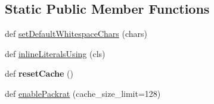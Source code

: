 \subsection*{Static Public Member Functions}
\begin{DoxyCompactItemize}
\item 
def \hyperlink{classpkg__resources_1_1__vendor_1_1pyparsing_1_1_parser_element_af1dc7ba7745bc9323f0559b197abe429}{set\+Default\+Whitespace\+Chars} (chars)
\item 
def \hyperlink{classpkg__resources_1_1__vendor_1_1pyparsing_1_1_parser_element_a0cc7c1046ec15301a82d135bad3190ba}{inline\+Literals\+Using} (cls)
\item 
\mbox{\label{classpkg__resources_1_1__vendor_1_1pyparsing_1_1_parser_element_aaa05acff87a4316ef93406a9f878d47c}} 
def {\bfseries reset\+Cache} ()
\item 
def \hyperlink{classpkg__resources_1_1__vendor_1_1pyparsing_1_1_parser_element_a93be52be442d95742db8b799a5a1c7b3}{enable\+Packrat} (cache\+\_\+size\+\_\+limit=128)
\end{DoxyCompactItemize}
